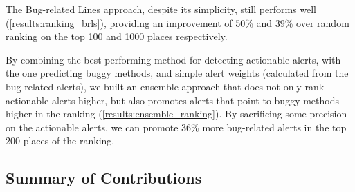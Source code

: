 The Bug-related Lines approach, despite its simplicity, still performs well (\cref{results:ranking_brls}), providing an improvement of 50\% and 39\% over random ranking on the top 100 and 1000 places respectively.
 

By combining the best performing method for detecting actionable alerts, with the one predicting buggy methods, and simple alert weights (calculated from the bug-related alerts), we built an ensemble approach that does not only rank actionable alerts higher, but also promotes alerts that point to buggy methods higher in the ranking (\cref{results:ensemble_ranking}). By sacrificing some precision on the actionable alerts, we can promote 36\% more bug-related alerts in the top 200 places of the ranking.


\subsection{Summary of Contributions}
 
